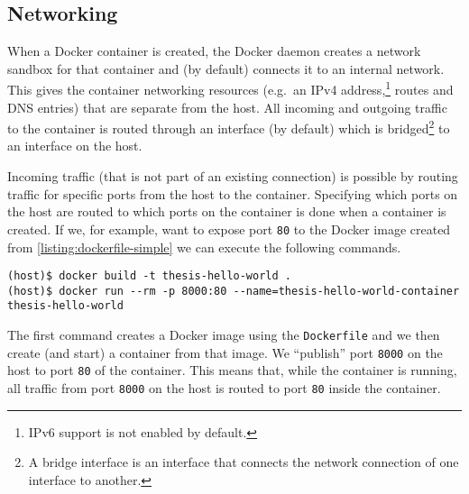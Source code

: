 \subsection{Networking}
When a Docker container is created, the Docker daemon creates a network sandbox for that container and (by default) connects it to an internal network. This gives the container networking resources (e.g.\ an IPv4 address,\footnote{IPv6 support is not enabled by default.} routes and DNS entries) that are separate from the host. All incoming and outgoing traffic to the container is routed through an interface (by default) which is bridged\footnote{A bridge interface is an interface that connects the network connection of one interface to another.} to an interface on the host.

\medskip

Incoming traffic (that is not part of an existing connection) is possible by routing traffic for specific ports from the host to the container.
Specifying which ports on the host are routed to which ports on the container is done when a container is created. If we, for example, want to expose port \lstinline{80} to the Docker image created from \autoref{listing:dockerfile-simple} we can execute the following commands.

\begin{lstlisting}[caption={Creating a Docker container with exposed port.},label={listing:docker-port},captionpos=b]
(host)$ docker build -t thesis-hello-world .
(host)$ docker run --rm -p 8000:80 --name=thesis-hello-world-container thesis-hello-world
\end{lstlisting}

The first command creates a Docker image using the \lstinline{Dockerfile} and we then create (and start) a container from that image. We ``publish'' port \lstinline{8000} on the host to port \lstinline{80} of the container. This means that, while the container is running, all traffic from port \lstinline{8000} on the host is routed to port \lstinline{80} inside the container.

